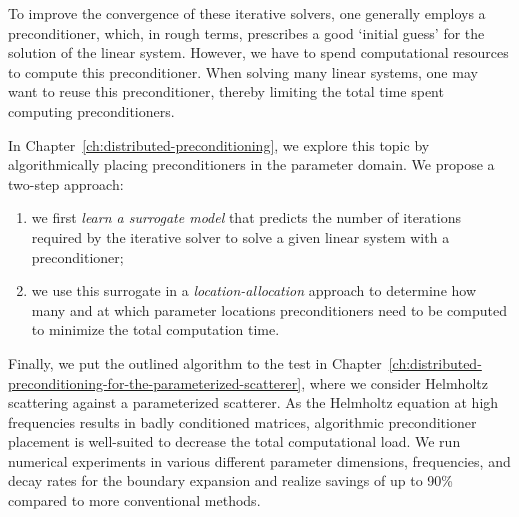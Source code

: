 To improve the convergence of these iterative solvers, one generally employs a preconditioner, which, in rough terms, prescribes a good `initial guess' for the solution of the linear system.
However, we have to spend computational resources to compute this preconditioner.
When solving many linear systems, one may want to reuse this preconditioner, thereby limiting the total time spent computing preconditioners.

In Chapter~\ref{ch:distributed-preconditioning}, we explore this topic by algorithmically placing preconditioners in the parameter domain.
We propose a two-step approach:
\begin{enumerate}
    \item we first \emph{learn a surrogate model} that predicts the number of iterations required by the iterative solver to solve a given linear system with a preconditioner;
    \item we use this surrogate in a \emph{location-allocation} approach to determine how many and at which parameter locations preconditioners need to be computed to minimize the total computation time.
\end{enumerate}

Finally, we put the outlined algorithm to the test in Chapter~\ref{ch:distributed-preconditioning-for-the-parameterized-scatterer}, where we consider Helmholtz scattering against a parameterized scatterer.
As the Helmholtz equation at high frequencies results in badly conditioned matrices, algorithmic preconditioner placement is well-suited to decrease the total computational load.
We run numerical experiments in various different parameter dimensions, frequencies, and decay rates for the boundary expansion and realize savings of up to 90\% compared to more conventional methods.